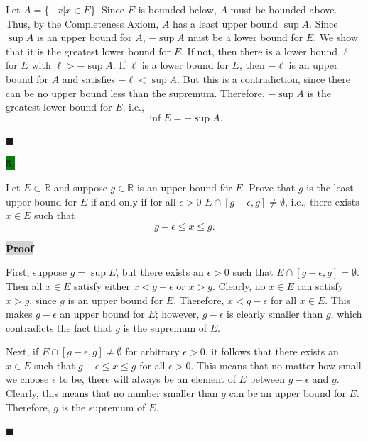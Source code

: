 \documentclass[12pt]{article}
\newcommand{\mybox}{%
    \collectbox{%
        \setlength{\fboxsep}{2pt}%
        \fbox{\BOXCONTENT}%
    }%
}
\begin{document}
\noindent Let $A = \lbrace -x | x \in E \rbrace$. Since $E$ is bounded below, $A$ must be bounded above. Thus, by the Completeness Axiom, $A$ has a least upper bound $\sup A$. Since $\sup A$ is an upper bound for $A$, $-\sup A$ must be a lower bound for $E$. We show that it is the greatest lower bound for $E$. If not, then there is a lower bound $\ell$ for $E$ with $\ell > -\sup A$. If $\ell$ is a lower bound for $E$, then $-\ell$ is an upper bound for $A$ and satisfies $-\ell < \sup A$.  But this is a contradiction, since there can be no upper bound less than the supremum. Therefore, $-\sup A$ is the greatest lower bound for $E$, i.e., $$\inf E = -\sup A.$$

\hfill$\blacksquare$

\noindent\mybox{\colorbox{green}{\textbf{5.}}}\hspace{3mm}\hrulefill

\noindent Let $E\subset \mathbb{R}$ and suppose $g\in \mathbb{R}$ is an upper bound for $E$. Prove that $g$ is the least upper bound for $E$ if and only if for all $\epsilon > 0$ $E\cap[g-\epsilon, g] \neq \emptyset$, i.e., there exists $x\in E$ such that $$g-\epsilon \leq x \leq g.$$  

\vspace{5mm}

\noindent\mybox{\colorbox{lightgray}{\textbf{Proof}}} \hspace{3mm}\hrulefill

\noindent First, suppose $g = \sup E$, but there exists an $\epsilon > 0$ such that $E\cap[g-\epsilon, g] = \emptyset$. Then all $x\in E$ satisfy either $x< g - \epsilon$ or $x>g$. Clearly, no $x\in E$ can satisfy $x>g$, since $g$ is an upper bound for $E$. Therefore, $x < g - \epsilon$ for all $x\in E$. This makes $g-\epsilon$ an upper bound for $E$; however, $g - \epsilon$ is clearly smaller than $g$, which contradicts the fact that $g$ is the supremum of $E$.

\vspace{5mm}

\noindent Next, if $E\cap[g-\epsilon, g] \neq \emptyset$ for arbitrary $\epsilon > 0$, it follows that there exists an $x\in E$ such that $g-\epsilon \leq x \leq g$ for all $\epsilon > 0$. This means that no matter how small we choose $\epsilon$ to be, there will always be an element of $E$ between $g-\epsilon$ and $g$. Clearly, this means that no number smaller than $g$ can be an upper bound for $E$. Therefore, $g$ is the supremum of $E$.

\hfill$\blacksquare$
\end{document}
